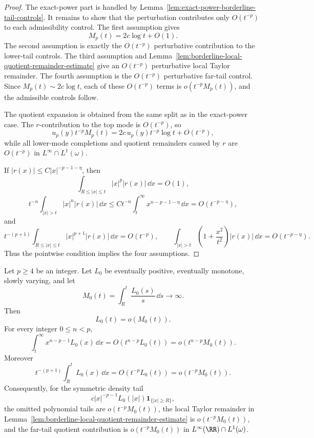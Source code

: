 \begin{proof}
The exact-power part is handled by
Lemma~\ref{lem:exact-power-borderline-tail-controls}.  It remains to show
that the perturbation contributes only \(O(t^{-p})\) to each admissibility
control.  The first assumption gives
\[
M_p(t)=2c\log t+O(1).
\]
The second assumption is exactly the \(O(t^{-p})\) perturbative contribution
to the lower-tail controls.  The third assumption and
Lemma~\ref{lem:borderline-local-quotient-remainder-estimate} give an
\(O(t^{-p})\) perturbative local Taylor remainder.  The fourth assumption is
the \(O(t^{-p})\) perturbative far-tail control.  Since
\(M_p(t)\sim2c\log t\), each of these \(O(t^{-p})\) terms is
\(o(t^{-p}M_p(t))\), and the admissible controls follow.

The quotient expansion is obtained from the same split as in the exact-power
case.  The \(r\)-contribution to the top mode is \(O(t^{-p})\), so
\[
u_p(y)t^{-p}M_p(t)
=2c\,u_p(y)t^{-p}\log t+O(t^{-p}),
\]
while all lower-mode completions and quotient remainders caused by \(r\) are
\(O(t^{-p})\) in \(L^\infty\cap L^1(\omega)\).

If \(|r(x)|\le C|x|^{-p-1-\eta}\), then
\[
\int_{R\le |x|\le t}|x|^p|r(x)|\,\dd x=O(1),
\]
\[
t^{-n}\int_{|x|>t}|x|^n|r(x)|\,\dd x
\le C t^{-n}\int_t^\infty x^{n-p-1-\eta}\,\dd x
=O(t^{-p-\eta}),
\]
and
\[
t^{-(p+1)}\int_{R\le |x|\le t}|x|^{p+1}|r(x)|\,\dd x=O(t^{-p}),
\qquad
\int_{|x|>t}\left(1+\frac{x^2}{t^2}\right)|r(x)|\,\dd x
=O(t^{-p-\eta}).
\]
Thus the pointwise condition implies the four assumptions.
\end{proof}

\begin{lemma}
\label{lem:slowly-varying-integral-controls}
Let \(p\ge4\) be an integer.  Let \(L_0\) be eventually positive, eventually
monotone, slowly varying, and let
\[
  M_0(t)=\int_R^t\frac{L_0(s)}{s}\,\dd s\to\infty .
\]
Then
\[
  L_0(t)=o(M_0(t)).
\]
For every integer \(0\le n<p\),
\begin{equation}\label{eq:slowly-varying-polynomial-tail-control}
  \int_t^\infty x^{n-p-1}L_0(x)\,\dd x
  =O(t^{n-p}L_0(t))
  =o(t^{n-p}M_0(t)).
\end{equation}
Moreover
\begin{equation}\label{eq:slowly-varying-local-integral-control}
  t^{-(p+1)}\int_R^tL_0(x)\,\dd x
  =O(t^{-p}L_0(t))
  =o(t^{-p}M_0(t)).
\end{equation}
Consequently, for the symmetric density tail
\[
  c|x|^{-p-1}L_0(|x|)\mathbf1_{\{|x|\ge R\}},
\]
the omitted polynomial tails are \(o(t^{-p}M_0(t))\), the local Taylor
remainder in
Lemma~\ref{lem:borderline-local-quotient-remainder-estimate} is
\(o(t^{-p}M_0(t))\), and the far-tail quotient contribution is
\(o(t^{-p}M_0(t))\) in \(L^\infty(\RR)\cap L^1(\omega)\).
\end{lemma}

